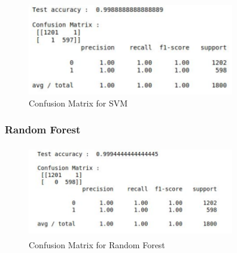 \begin{figure}[H]
  \includegraphics[height = 4cm,width= 9cm]{images/12_SVM}
\caption{Confusion Matrix for SVM}  
  \end{figure}

\subsubsection{Random Forest}

\begin{figure}[H]
  \includegraphics[height = 4cm,width= 9cm]{images/12_rand}
\caption{Confusion Matrix for Random Forest}
\end{figure}
